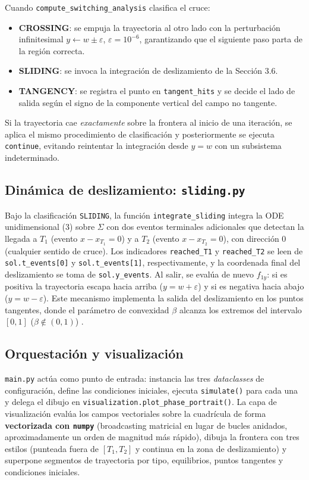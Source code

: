 \documentclass[12pt,letterpaper]{article}
\begin{document}
Cuando \texttt{compute\_switching\_analysis} clasifica el cruce:
\begin{itemize}
    \item \textbf{CROSSING}: se empuja la trayectoria al otro lado con la perturbación infinitesimal $y \leftarrow w \pm \varepsilon$, $\varepsilon=10^{-6}$, garantizando que el siguiente paso parta de la región correcta.
    \item \textbf{SLIDING}: se invoca la integración de deslizamiento de la Sección 3.6.
    \item \textbf{TANGENCY}: se registra el punto en \texttt{tangent\_hits} y se decide el lado de salida según el signo de la componente vertical del campo no tangente.
\end{itemize}
Si la trayectoria cae \emph{exactamente} sobre la frontera al inicio de una iteración, se aplica el mismo procedimiento de clasificación y posteriormente se ejecuta \texttt{continue}, evitando reintentar la integración desde $y = w$ con un subsistema indeterminado.

\subsection{Dinámica de deslizamiento: \texttt{sliding.py}}
Bajo la clasificación \texttt{SLIDING}, la función \texttt{integrate\_sliding} integra la ODE unidimensional (3) sobre $\Sigma$ con dos eventos terminales adicionales que detectan la llegada a $T_1$ (evento $x - x_{T_1} = 0$) y a $T_2$ (evento $x - x_{T_2} = 0$), con dirección 0 (cualquier sentido de cruce). Los indicadores \texttt{reached\_T1} y \texttt{reached\_T2} se leen de \texttt{sol.t\_events[0]} y \texttt{sol.t\_events[1]}, respectivamente, y la coordenada final del deslizamiento se toma de \texttt{sol.y\_events}. Al salir, se evalúa de nuevo $f_{1y}$: si es positiva la trayectoria escapa hacia arriba ($y = w + \varepsilon$) y si es negativa hacia abajo ($y = w - \varepsilon$). Este mecanismo implementa la salida del deslizamiento en los puntos tangentes, donde el parámetro de convexidad $\beta$ alcanza los extremos del intervalo $[0,1]$ ($\beta\notin(0,1)$) \cite{piiroinen2008event}.

\subsection{Orquestación y visualización}
\texttt{main.py} actúa como punto de entrada: instancia las tres \emph{dataclasses} de configuración, define las condiciones iniciales, ejecuta \texttt{simulate()} para cada una y delega el dibujo en \texttt{visualization.\allowbreak plot\_phase\_portrait()}. La capa de visualización evalúa los campos vectoriales sobre la cuadrícula de forma \textbf{vectorizada con \texttt{numpy}} (broadcasting matricial en lugar de bucles anidados, aproximadamente un orden de magnitud más rápido), dibuja la frontera con tres estilos (punteada fuera de $[T_1,T_2]$ y continua en la zona de deslizamiento) y superpone segmentos de trayectoria por tipo, equilibrios, puntos tangentes y condiciones iniciales.
\end{document}
